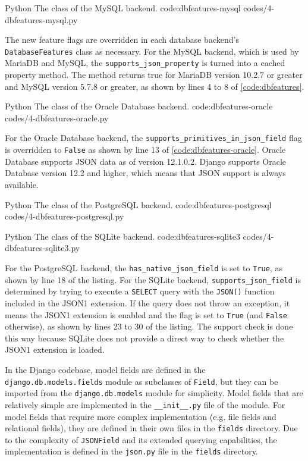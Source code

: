 \listing
{Python}
{The  class of the MySQL backend.}
{code:dbfeatures-mysql}
{codes/4-dbfeatures-mysql.py}

The new feature flags are overridden in each database backend's
\verb|DatabaseFeatures| class as necessary. For the MySQL backend, which is
used by MariaDB and MySQL, the \verb|supports_json_property| is turned into a
cached property method. The method returns true for MariaDB version 10.2.7 or
greater and MySQL version 5.7.8 or greater, as shown by lines 4 to 8 of
\autoref{code:dbfeatures}.

\listing
{Python}
{The  class of the Oracle Database backend.}
{code:dbfeatures-oracle}
{codes/4-dbfeatures-oracle.py}

For the Oracle Database backend, the
\verb|supports_primitives_in_json_field| flag is overridden to \verb|False|
as shown by line 13 of \autoref{code:dbfeatures-oracle}. Oracle Database supports JSON data as of
version 12.1.0.2. Django supports Oracle Database version 12.2 and higher,
which means that JSON support is always available.

\listing
{Python}
{The  class of the PostgreSQL backend.}
{code:dbfeatures-postgresql}
{codes/4-dbfeatures-postgresql.py}

\listing
{Python}
{The  class of the SQLite backend.}
{code:dbfeatures-sqlite3}
{codes/4-dbfeatures-sqlite3.py}

For the PostgreSQL backend, the \verb|has_native_json_field| is set to \verb|True|, as
shown by line 18 of the listing. For the SQLite backend,
\verb|supports_json_field| is determined by trying to execute a \verb|SELECT|
query with the \verb|JSON()| function included in the JSON1 extension. If the
query does not throw an exception, it means the JSON1 extension is enabled and
the flag is set to \verb|True| (and \verb|False| otherwise), as shown by lines
23 to 30 of the listing. The support check is done this way because SQLite does
not provide a direct way to check whether the JSON1 extension is loaded.

In the Django codebase, model fields are defined in the
\verb|django.db.models.fields| module as subclasses of \verb|Field|, but they
can be imported from the \verb|django.db.models| module for simplicity. Model
fields that are relatively simple are implemented in the \verb|__init__.py|
file of the module. For model fields that require more complex implementation
(e.g. file fields and relational fields), they are defined in their own files
in the \verb|fields| directory. Due to the complexity of \verb|JSONField| and
its extended querying capabilities, the implementation is defined in the
\verb|json.py| file in the \verb|fields| directory.


